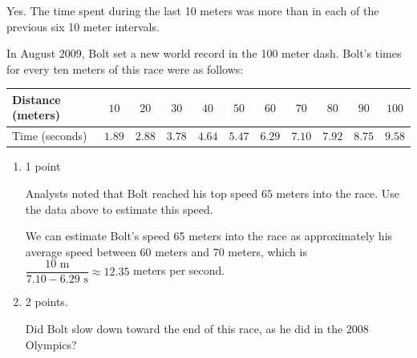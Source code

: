 \documentclass{article}
\begin{document}
\begin{enumerate}
\begin{enumerate}
    \begin{solution} %
      Yes. The time spent during the last 10 meters was more than in each
      of the previous six 10 meter intervals. 
    \end{solution}

  \end{enumerate}

  In August 2009, Bolt set a new world record in the 100 meter dash. Bolt's times for every ten meters of this race were as follows: %
  \begin{center}
    \begin{tabular}{l*{10}{c}}
      \hline
      Distance (meters) & $10$ &  $20$ &  $30$ &  $40$ &  $50$ &
      $60$ &  $70$ &  $80$ &  $90$ &  $100$ \\
      \hline
      Time (seconds) & $1.89$ & $2.88$ &  $3.78$ & $4.64$ &  $5.47$ &
      $6.29$ & $7.10$ & $7.92$ & $8.75$ & $9.58$ \\
      \hline
    \end{tabular}
  \end{center}
  \begin{enumerate}[resume]
  \item

    \begin{grading}
      1 point
    \end{grading}

    \begin{problem}[\vfill]
      Analysts noted that Bolt reached his top speed $65$ meters into the
      race.  Use the data above to estimate this speed.
    \end{problem}

    \begin{solution} %
      We can estimate Bolt's speed 65 meters into the race as
      approximately his average speed between 60 meters and 70 meters,
      which is $\dfrac{10 \text{ m}}{7.10-6.29 \text{ s}} \approx 12.35$
      meters per second.
    \end{solution}

  \item
    \begin{grading}
      2 points. 
    \end{grading}

    \begin{problem}[\vfill]
      Did Bolt slow down toward the end of this race, as he did in the 2008 Olympics?
    \end{problem}


\end{enumerate}
\end{enumerate}
\end{document}
